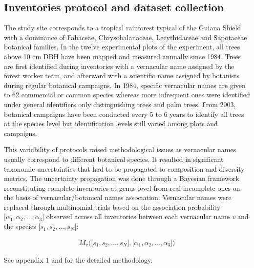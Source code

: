 \documentclass[fleqn,10pt]{ArtEcoFoG} %
\theoremstyle{definition}
\theoremstyle{definition}
\theoremstyle{definition}
\theoremstyle{remark}
\begin{document}
\subsection{Inventories protocol and dataset
collection}\label{inventories-protocol-and-dataset-collection}

The study site corresponds to a tropical rainforest typical of the
Guiana Shield with a dominance of Fabaceae, Chrysobalanaceae,
Lecythidaceae and Sapotaceae botanical families. In the twelve
experimental plots of the experiment, all trees above 10 cm DBH have
been mapped and measured annually since 1984. Trees are first identified
during inventories with a vernacular name assigned by the forest worker
team, and afterward with a scientific name assigned by botanists during
regular botanical campaigns. In 1984, specific vernacular names are
given to 62 commercial or common species whereas more infrequent ones
were identified under general identifiers only distinguishing trees and
palm trees. From 2003, botanical campaigns have been conducted every 5
to 6 years to identify all trees at the species level but identification
levels still varied among plots and campaigns.

This variability of protocols raised methodological issues as vernacular
names usually correspond to different botanical species. It resulted in
significant taxonomic uncertainties that had to be propagated to
composition and diversity metrics. The uncertainty propagation was done
through a Bayesian framework reconstituting complete inventories at
genus level from real incomplete ones on the basis of
vernacular/botanical names association. Vernacular names were replaced
through multinomial trials based on the association probability
\(\big[\alpha_1, \alpha_2,…, \alpha_3\big]\) observed across all
inventories between each vernacular name \emph{v} and the species
\(\big[s_1, s_2, …, s_N\big]\):

\begin{align}
M_v\Big(\big[s_1, s_2, …, s_N\big],\big[\alpha_1, \alpha_2,…, \alpha_3\big]\Big) \nonumber
\end{align}

See appendix 1 and \citet{Aubry-Kientz2013} for the detailed
methodology.
\end{document}
